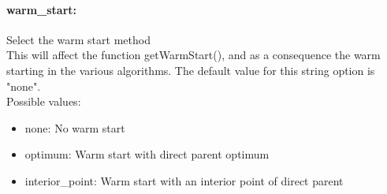\paragraph{warm\_start:}\label{sec:warm_start} Select the warm start method $\;$ \\
 This will affect the function getWarmStart(), and
as a consequence the warm starting in the various
algorithms.
The default value for this string option is "none".
\\ 
Possible values:
\begin{itemize}
   \item none: No warm start
   \item optimum: Warm start with direct parent optimum
   \item interior\_point: Warm start with an interior point of direct
parent
\end{itemize}

